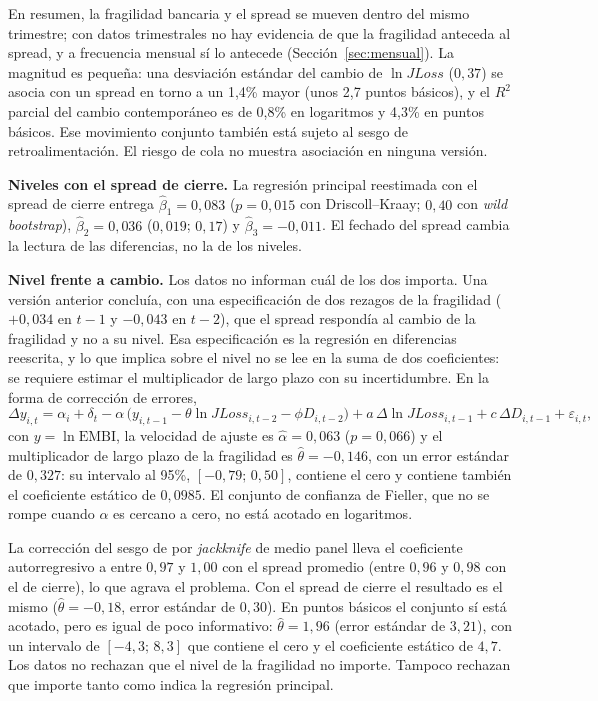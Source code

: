 En resumen, la fragilidad bancaria y el spread se mueven dentro del mismo trimestre; con datos trimestrales no hay evidencia de que la fragilidad anteceda al spread, y a frecuencia mensual sí lo antecede (Sección~\ref{sec:mensual}). La magnitud es pequeña: una desviación estándar del cambio de $\ln JLoss$ ($0{,}37$) se asocia con un spread en torno a un 1,4\% mayor (unos 2,7 puntos básicos), y el $R^2$ parcial del cambio contemporáneo es de 0,8\% en logaritmos y 4,3\% en puntos básicos. Ese movimiento conjunto también está sujeto al sesgo de retroalimentación. El riesgo de cola no muestra asociación en ninguna versión.

\textbf{Niveles con el spread de cierre.} La regresión principal reestimada con el spread de cierre entrega $\hat\beta_1=0{,}083$ ($p=0{,}015$ con Driscoll--Kraay; $0{,}40$ con \textit{wild bootstrap}), $\hat\beta_2=0{,}036$ ($0{,}019$; $0{,}17$) y $\hat\beta_3=-0{,}011$. El fechado del spread cambia la lectura de las diferencias, no la de los niveles.

\textbf{Nivel frente a cambio.} Los datos no informan cuál de los dos importa. Una versión anterior concluía, con una especificación de dos rezagos de la fragilidad ($+0{,}034$ en $t-1$ y $-0{,}043$ en $t-2$), que el spread respondía al cambio de la fragilidad y no a su nivel. Esa especificación es la regresión en diferencias reescrita, y lo que implica sobre el nivel no se lee en la suma de dos coeficientes: se requiere estimar el multiplicador de largo plazo con su incertidumbre. En la forma de corrección de errores,
\begin{equation}
\Delta y_{i,t}=\alpha_i+\delta_t-\alpha\,\bigl(y_{i,t-1}-\theta\ln JLoss_{i,t-2}-\phi D_{i,t-2}\bigr)+a\,\Delta\ln JLoss_{i,t-1}+c\,\Delta D_{i,t-1}+\varepsilon_{i,t},
\label{eq:ecm}
\end{equation}
con $y=\ln\mathrm{EMBI}$, la velocidad de ajuste es $\hat\alpha=0{,}063$ ($p=0{,}066$) y el multiplicador de largo plazo de la fragilidad es $\hat\theta=-0{,}146$, con un error estándar de $0{,}327$: su intervalo al 95\%, $[-0{,}79;\,0{,}50]$, contiene el cero y contiene también el coeficiente estático de $0{,}0985$. El conjunto de confianza de Fieller, que no se rompe cuando $\alpha$ es cercano a cero, no está acotado en logaritmos.

La corrección del sesgo de \citet{Nickell1981} por \textit{jackknife} de medio panel lleva el coeficiente autorregresivo a entre $0{,}97$ y $1{,}00$ con el spread promedio (entre $0{,}96$ y $0{,}98$ con el de cierre), lo que agrava el problema. Con el spread de cierre el resultado es el mismo ($\hat\theta=-0{,}18$, error estándar de $0{,}30$). En puntos básicos el conjunto sí está acotado, pero es igual de poco informativo: $\hat\theta=1{,}96$ (error estándar de $3{,}21$), con un intervalo de $[-4{,}3;\,8{,}3]$ que contiene el cero y el coeficiente estático de $4{,}7$. Los datos no rechazan que el nivel de la fragilidad no importe. Tampoco rechazan que importe tanto como indica la regresión principal.

